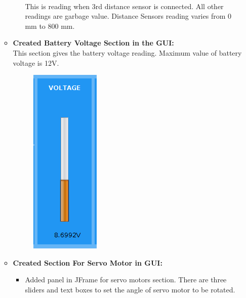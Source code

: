 \documentclass[a4paper,12pt,oneside]{book}
\begin{document}
\begin{enumerate}
\begin{itemize}
\begin{itemize}
\begin{figure}[h]
\begin{center}
					\end{center}
				\end{figure} \\
				This is reading when 3rd distance sensor is connected. All other readings are garbage value. Distance Sensors reading varies from 0 mm to 800 mm.
			\end{itemize} 
			\newpage
			\item \textbf{Created Battery Voltage Section in the GUI:}\\
			 This section gives the battery voltage reading. Maximum value of battery voltage is 12V.
				\begin{figure}[h]
			 		\begin{center}
			 			\includegraphics[scale=0.75]{batteryvoltage.png}
			 		\end{center}
			 	\end{figure} 
			 \item \textbf{Created Section For Servo Motor in GUI:} \\
			 \begin{itemize}
			 	\item Added panel in JFrame for servo motors section. There are three sliders and text boxes to set the angle of servo motor to be rotated.
			 	

\end{itemize}
\end{itemize}
\end{enumerate}
\end{document}
